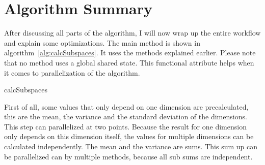 \section{Algorithm Summary}
After discussing all parts of the algorithm, I will now wrap up the entire workflow and explain some optimizations. The main method is shown in algorithm~\ref{alg:calcSubspaces}. It uses the methods explained earlier. Please note that no method uses a global shared state. This functional attribute helps when it comes to parallelization of the algorithm.

\begin{algorithm}


	\caption{calcSubspaces}
	\label{alg:calcSubspaces}
\end{algorithm}

First of all, some values that only depend on one dimension are precalculated, this are the mean, the variance and the standard deviation of the dimensions. This step can parallelized at two points. Because the result for one dimension only depends on this dimension itself, the values for multiple dimensions can be calculated independently. The mean and the variance are sums. This sum up can be parallelized can by multiple methods, because all sub sums are independent.

